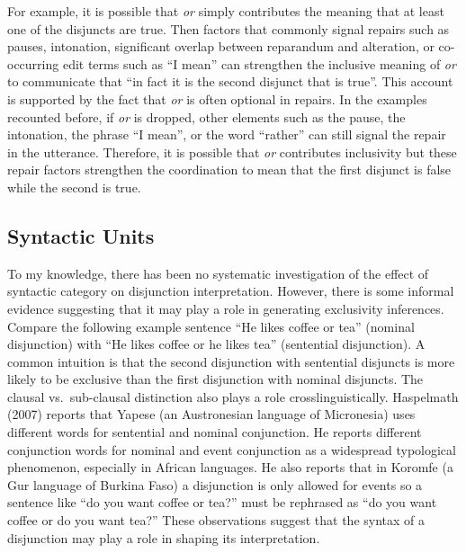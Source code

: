 \documentclass[oneside]{report}
\theoremstyle{definition}
\theoremstyle{definition}
\theoremstyle{definition}
\theoremstyle{remark}
\begin{document}
For example, it is possible that \emph{or} simply contributes the
meaning that at least one of the disjuncts are true. Then factors that
commonly signal repairs such as pauses, intonation, significant overlap
between reparandum and alteration, or co-occurring edit terms such as
``I mean'' can strengthen the inclusive meaning of \emph{or} to
communicate that ``in fact it is the second disjunct that is true''.
This account is supported by the fact that \emph{or} is often optional
in repairs. In the examples recounted before, if \emph{or} is dropped,
other elements such as the pause, the intonation, the phrase ``I mean'',
or the word ``rather'' can still signal the repair in the utterance.
Therefore, it is possible that \emph{or} contributes inclusivity but
these repair factors strengthen the coordination to mean that the first
disjunct is false while the second is true.

\subsection{Syntactic Units}\label{syntactic-units}

To my knowledge, there has been no systematic investigation of the
effect of syntactic category on disjunction interpretation. However,
there is some informal evidence suggesting that it may play a role in
generating exclusivity inferences. Compare the following example
sentence ``He likes coffee or tea'' (nominal disjunction) with ``He
likes coffee or he likes tea'' (sentential disjunction). A common
intuition is that the second disjunction with sentential disjuncts is
more likely to be exclusive than the first disjunction with nominal
disjuncts. The clausal vs.~sub-clausal distinction also plays a role
crosslinguistically. Haspelmath (2007) reports that Yapese (an
Austronesian language of Micronesia) uses different words for sentential
and nominal conjunction. He reports different conjunction words for
nominal and event conjunction as a widespread typological phenomenon,
especially in African languages. He also reports that in Koromfe (a Gur
language of Burkina Faso) a disjunction is only allowed for events so a
sentence like ``do you want coffee or tea?'' must be rephrased as ``do
you want coffee or do you want tea?'' These observations suggest that
the syntax of a disjunction may play a role in shaping its
interpretation.
\end{document}
